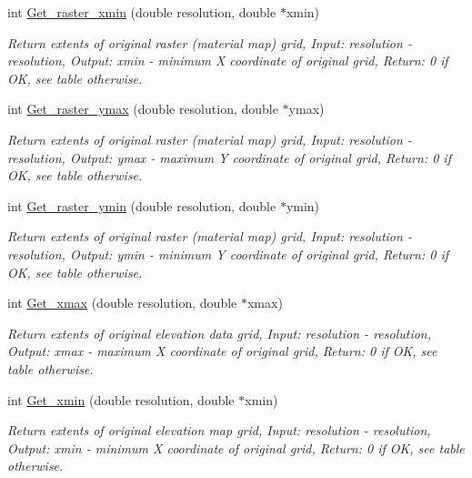 \begin{CompactItemize}
int \hyperlink{GisApi_8C_a46}{Get\_\-raster\_\-xmin} (double resolution, double $\ast$xmin)
\begin{CompactList}\small\item\em Return extents of original raster (material map) grid, Input: resolution - resolution, Output: xmin - minimum X coordinate of original grid, Return: 0 if OK, see table otherwise. \item\end{CompactList}\item 
int \hyperlink{GisApi_8C_a47}{Get\_\-raster\_\-ymax} (double resolution, double $\ast$ymax)
\begin{CompactList}\small\item\em Return extents of original raster (material map) grid, Input: resolution - resolution, Output: ymax - maximum Y coordinate of original grid, Return: 0 if OK, see table otherwise. \item\end{CompactList}\item 
int \hyperlink{GisApi_8C_a48}{Get\_\-raster\_\-ymin} (double resolution, double $\ast$ymin)
\begin{CompactList}\small\item\em Return extents of original raster (material map) grid, Input: resolution - resolution, Output: ymin - minimum Y coordinate of original grid, Return: 0 if OK, see table otherwise. \item\end{CompactList}\item 
int \hyperlink{GisApi_8C_a49}{Get\_\-xmax} (double resolution, double $\ast$xmax)
\begin{CompactList}\small\item\em Return extents of original elevation data grid, Input: resolution - resolution, Output: xmax - maximum X coordinate of original grid, Return: 0 if OK, see table otherwise. \item\end{CompactList}\item 
int \hyperlink{GisApi_8C_a50}{Get\_\-xmin} (double resolution, double $\ast$xmin)
\begin{CompactList}\small\item\em Return extents of original elevation map grid, Input: resolution - resolution, Output: xmin - minimum X coordinate of original grid, Return: 0 if OK, see table otherwise. \item\end{CompactList}\item 

\end{CompactItemize}
